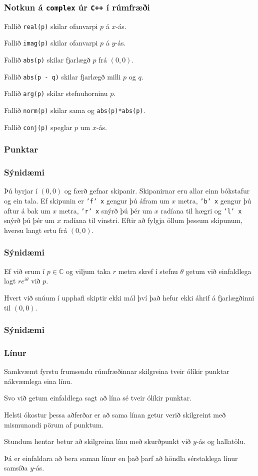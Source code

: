 {
	\frametitle{Notkun á \texttt{complex} úr \texttt{C++} í rúmfræði}
	{
		\item<1-> Fallið \texttt{real(p)} skilar ofanvarpi $p$ á $x$-ás.
		\item<2-> Fallið \texttt{imag(p)} skilar ofanvarpi $p$ á $y$-ás.
		\item<3-> Fallið \texttt{abs(p)} skilar fjarlægð $p$ frá $(0, 0)$.
		\item<4-> Fallið \texttt{abs(p - q)} skilar fjarlægð milli $p$ og $q$.
		\item<5-> Fallið \texttt{arg(p)} skilar stefnuhorninu $p$.
		\item<6-> Fallið \texttt{norm(p)} skilar sama og \texttt{abs(p)*abs(p)}.
		\item<7-> Fallið \texttt{conj(p)} speglar $p$ um $x$-ás.
	}
}

{
	\frametitle{Punktar}
}

{
	\frametitle{Sýnidæmi}
	Þú byrjar í $(0, 0)$ og færð gefnar skipanir. Skipanirnar eru allar einn bókstafur og ein tala.
	Ef skipunin er \texttt{'f' x} gengur þú áfram um $x$ metra, \texttt{'b' x} gengur þú aftur á bak
	um $x$ metra, \texttt{'r' x} snýrð þú þér um $x$ radíana til hægri og \texttt{'l' x} snýrð þú
	þér um $x$ radíana til vinstri. Eftir að fylgja öllum þessum skipunum, hversu langt ertu frá
	$(0, 0)$.
}

{
	\frametitle{Sýnidæmi}
	{
		\item<1-> Ef við erum í $p \in \mathbb{C}$ og viljum taka $r$ metra skref í stefnu $\theta$ getum
			við einfaldlega lagt $re^{i\theta}$ við $p$.
		\item<2-> Hvert við snúum í upphafi skiptir ekki mál því það hefur ekki áhrif á fjarlægðinni til $(0, 0)$.
	}
}

{
	\frametitle{Sýnidæmi}
}

{
	\frametitle{Línur}
	{
		\item<1-> Samkvæmt fyrstu frumsendu rúmfræðinnar skilgreina tveir ólíkir punktar nákvæmlega eina línu.
		\item<2-> Svo við getum einfaldlega sagt að lína sé tveir ólíkir punktar.
		\item<3-> Helsti ókostur þessa aðferðar er að sama línan getur verið skilgreint með mismunandi pörum af punktum.
		\item<4-> Stundum hentar betur að skilgreina línu með skurðpunkt við $y$-ás og hallatölu. 
		\item<5-> Þá er einfaldara að bera saman línur en það þarf að höndla sérstaklega línur samsíða $y$-ás.
	}
}

